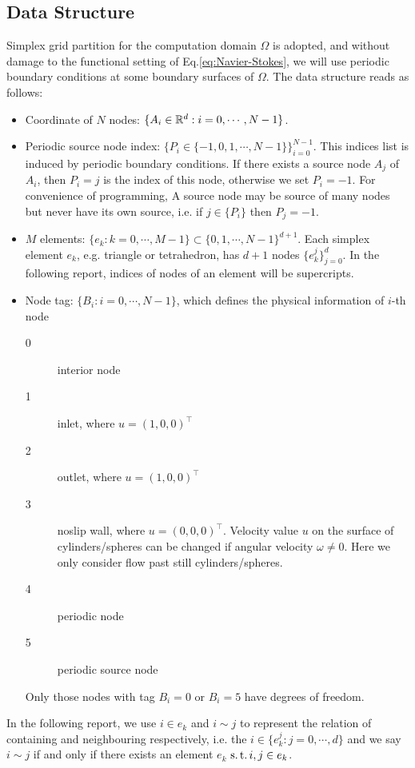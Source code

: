 \subsection{Data Structure}
Simplex grid partition for the computation domain $\Omega$ is adopted, 
and without damage to the functional setting of Eq.\eqref{eq:Navier-Stokes}, 
we will use periodic boundary conditions at some boundary surfaces of $\Omega$.
The data structure reads as follows:
\begin{itemize}
  \item Coordinate of $N$ nodes: $\{A_i\in\mathbb{R}^d:i=0,\cdots,N-1\}$.
  \item Periodic source node index: $\{P_i\in\{-1,0,1,\cdots,N-1\}\}_{i=0}^{N-1}$. 
    This indices list is induced by periodic boundary conditions.
    If there exists a source node $A_j$ of $A_i$, then $P_i=j$ is the index of this node, otherwise we set $P_i=-1$. 
    For convenience of programming, 
    A source node may be source of many nodes but never have its own source, 
    i.e. if $j\in\{P_i\}$ then $P_j=-1$.
  \item $M$ elements: $\{e_k:k=0,\cdots,M-1\}\subset\{0,1,\cdots,N-1\}^{d+1}$. 
    Each simplex element $e_k$, e.g. triangle or tetrahedron, has $d+1$ nodes $\{e_k^j\}_{j=0}^{d}$. 
    In the following report, indices of nodes of an element will be supercripts.
  \item Node tag: $\{B_i:i=0,\cdots,N-1\}$, which defines the physical information of $i$-th node
    \begin{description}
      \item[0] interior node
      \item[1] inlet, where $u=(1,0,0)^\top$
      \item[2] outlet, where $u=(1,0,0)^\top$
      \item[3] noslip wall, where $u=(0,0,0)^\top$. 
        Velocity value $u$ on the surface of cylinders/spheres can be changed 
        if angular velocity $\omega\neq0$. Here we only consider flow past still cylinders/spheres.
      \item[4] periodic node
      \item[5] periodic source node
    \end{description}
    Only those nodes with tag $B_i=0$ or $B_i=5$ have degrees of freedom.
\end{itemize}
In the following report, we use $i\in e_k$ and $i\sim j$ to represent the 
relation of containing and neighbouring respectively, i.e.
the $i\in\{e_k^j:j=0,\cdots,d\}$ and 
we say $i\sim j$ if and only if there exists an element $e_k$ $\operatorname*{s.t.} i,j\in e_k$.

